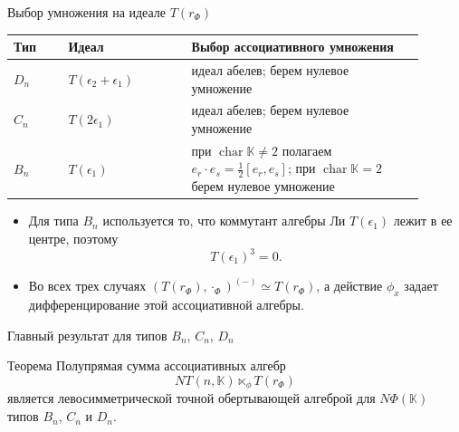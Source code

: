 \documentclass[12pt,aspectratio=169]{beamer}
\DeclareMathOperator{\Char}{char}
\newcommand{\K}{\mathbb{K}}
\begin{document}
\begin{frame}[t]{Выбор умножения на идеале $T(r_\Phi)$}
    \small
    \begin{center}
        \begin{tabular}{>{\raggedright\arraybackslash}p{0.12\linewidth} >{\raggedright\arraybackslash}p{0.27\linewidth} >{\raggedright\arraybackslash}p{0.51\linewidth}}
            \toprule
            Тип   & Идеал                        & Выбор ассоциативного умножения                  \\
            \midrule
            $D_n$ & $T(\epsilon_2 + \epsilon_1)$ & идеал абелев; берем нулевое умножение           \\
            $C_n$ & $T(2\epsilon_1)$             & идеал абелев; берем нулевое умножение           \\
            $B_n$ & $T(\epsilon_1)$              & при $\Char\K\neq 2$ полагаем
            $\displaystyle e_r\cdot e_s=\frac12[e_r,e_s]$; при $\Char\K=2$ берем нулевое умножение \\
            \bottomrule
        \end{tabular}
    \end{center}

    \begin{itemize}
        \item Для типа $B_n$ используется то, что коммутант алгебры Ли $T(\epsilon_1)$ лежит
              в ее центре, поэтому
              \[
                  T(\epsilon_1)^3=0.
              \]
        \item Во всех трех случаях $(T(r_\Phi),\cdot_\Phi)^{(-)}\simeq T(r_\Phi)$, а действие
              $\phi_x$ задает дифференцирование этой ассоциативной алгебры.
    \end{itemize}
\end{frame}

\begin{frame}[t]{Главный результат для типов $B_n$, $C_n$, $D_n$}
    \begin{alertblock}{Теорема}
        Полупрямая сумма ассоциативных алгебр
        \[
            NT(n,\K)\ltimes_\phi T(r_\Phi)
        \]
        является левосимметрической точной обертывающей алгеброй для $N\Phi(\K)$ типов
        $B_n$, $C_n$ и $D_n$.
    \end{alertblock}
\end{frame}
\end{document}
